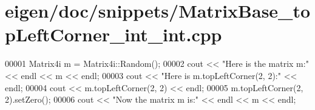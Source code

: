 \hypertarget{eigen_2doc_2snippets_2_matrix_base__top_left_corner__int__int_8cpp_source}{}\section{eigen/doc/snippets/\+Matrix\+Base\+\_\+top\+Left\+Corner\+\_\+int\+\_\+int.cpp}
\label{eigen_2doc_2snippets_2_matrix_base__top_left_corner__int__int_8cpp_source}

\begin{DoxyCode}
00001 Matrix4i m = Matrix4i::Random();
00002 cout << \textcolor{stringliteral}{"Here is the matrix m:"} << endl << m << endl;
00003 cout << \textcolor{stringliteral}{"Here is m.topLeftCorner(2, 2):"} << endl;
00004 cout << m.topLeftCorner(2, 2) << endl;
00005 m.topLeftCorner(2, 2).setZero();
00006 cout << \textcolor{stringliteral}{"Now the matrix m is:"} << endl << m << endl;
\end{DoxyCode}
